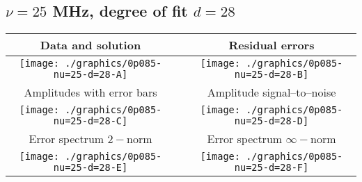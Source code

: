 

% 

\clearpage{}
\break{}

\subsection{$\nu = 25$ MHz, degree of fit $d = 28$}

\begin{table}[h]
    \begin{center}
        \begin{tabular}{ccc}
            Data and solution & \quad & Residual errors \\\hline
            \texttt{[image: ./graphics/0p085-nu=25-d=28-A]} &&
            \texttt{[image: ./graphics/0p085-nu=25-d=28-B]} \\[15pt]
            Amplitudes with error bars && Amplitude signal--to--noise \\\hline
            \texttt{[image: ./graphics/0p085-nu=25-d=28-C]} &&
            \texttt{[image: ./graphics/0p085-nu=25-d=28-D]} \\[15pt]
            Error spectrum $2-$norm && Error spectrum $\infty-$norm \\\hline
            \texttt{[image: ./graphics/0p085-nu=25-d=28-E]} &&
            \texttt{[image: ./graphics/0p085-nu=25-d=28-F]} \\[15pt]
        \end{tabular}
    \end{center}
\label{fig:elev=85, nu=25}
\end{table}



\endinput
